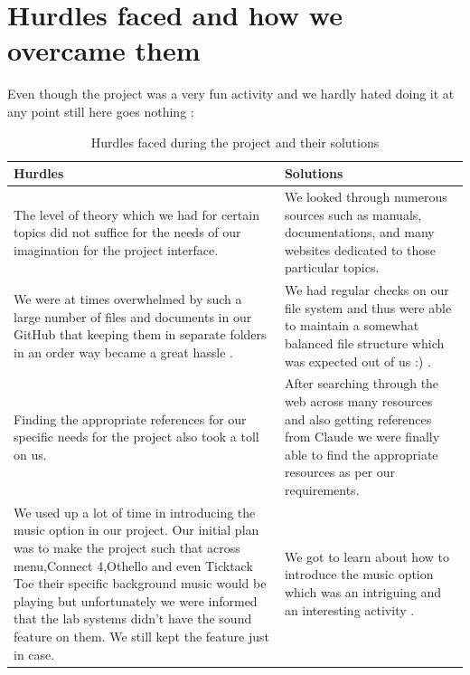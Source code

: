 \documentclass{article}
\begin{document}
\section*{Hurdles faced and how we overcame them }
Even though the project was a very fun activity and we hardly hated doing it at any point still here goes nothing :


\begin{table}[H]
\centering
\begin{tabular}{|p{10cm}|p{5cm}|}
\hline
\textbf{Hurdles} & \textbf{Solutions} \\ 
\hline

The level of theory which we had for certain topics did not suffice for the needs of our imagination for the project interface. 
&
We looked through numerous sources such as manuals, documentations, and many websites dedicated to those particular topics. \\

\hline
We were at times overwhelmed by such a large number of files and documents in our GitHub that keeping them in separate folders in an order way became a great hassle .

 & We had regular checks on our file system and thus were able to maintain a somewhat balanced file structure which was expected out of us :) .\\
 \hline
 Finding the appropriate references for our specific needs for the project also took a toll on us. 

 & After searching through the web across many resources and also getting references from Claude we were finally able to find the appropriate resources as per our requirements.\\
 \hline
We used up a lot of time in introducing the music option in our project. Our initial plan was to make the project such that across menu,Connect 4,Othello and even Ticktack Toe their specific background music would be playing but unfortunately we were informed that the lab systems didn't have the sound feature on them. We still kept the feature just in case.

 & We got to learn about how to introduce the music option which was an intriguing and an interesting activity .\\
 \hline
\end{tabular}
\caption{Hurdles faced during the project and their solutions}
\end{table}

\newpage
\end{document}
